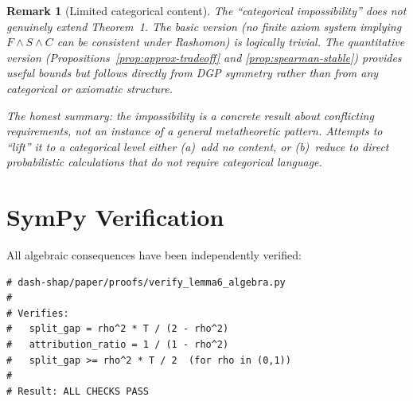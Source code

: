 \documentclass{article}
\newtheorem{remark}[theorem]{Remark}
\begin{document}
\begin{remark}[Limited categorical content]
\label{rem:categorical-limited}
The ``categorical impossibility'' does not genuinely extend
Theorem~1. The basic version (no finite axiom system implying
$F \wedge S \wedge C$ can be consistent under Rashomon) is
logically trivial. The quantitative version
(Propositions~\ref{prop:approx-tradeoff} and
\ref{prop:spearman-stable}) provides useful bounds but
follows directly from DGP symmetry rather than from
any categorical or axiomatic structure.

The honest summary: the impossibility is a \emph{concrete}
result about conflicting requirements, not an instance of a
general metatheoretic pattern. Attempts to ``lift'' it to a
categorical level either (a)~add no content, or (b)~reduce to
direct probabilistic calculations that do not require categorical
language.
\end{remark}


\section{SymPy Verification}

All algebraic consequences have been independently verified:

\begin{verbatim}
# dash-shap/paper/proofs/verify_lemma6_algebra.py
#
# Verifies:
#   split_gap = rho^2 * T / (2 - rho^2)
#   attribution_ratio = 1 / (1 - rho^2)
#   split_gap >= rho^2 * T / 2  (for rho in (0,1))
#
# Result: ALL CHECKS PASS
\end{verbatim}



\end{document}
